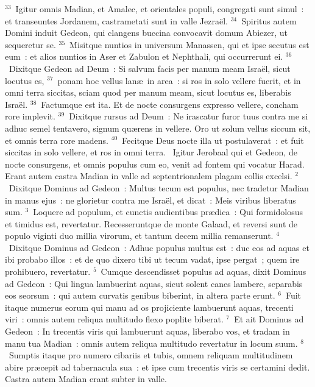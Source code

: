 ${}^{33}$~Igitur omnis Madian, et Amalec, et orientales populi, congregati sunt simul~: et transeuntes Jordanem, castrametati sunt in valle Jezra\"el.
${}^{34}$~Spiritus autem Domini induit Gedeon, qui clangens buccina convocavit domum Abiezer, ut sequeretur se.
${}^{35}$~Misitque nuntios in universum Manassen, qui et ipse secutus est eum~: et alios nuntios in Aser et Zabulon et Nephthali, qui occurrerunt ei.
${}^{36}$~Dixitque Gedeon ad Deum~: Si salvum facis per manum meam Isra\"el, sicut locutus es,
${}^{37}$~ponam hoc vellus lan\ae\ in area~: si ros in solo vellere fuerit, et in omni terra siccitas, sciam quod per manum meam, sicut locutus es, liberabis Isra\"el.
${}^{38}$~Factumque est ita. Et de nocte consurgens expresso vellere, concham rore implevit.
${}^{39}$~Dixitque rursus ad Deum~: Ne irascatur furor tuus contra me si adhuc semel tentavero, signum qu\ae rens in vellere. Oro ut solum vellus siccum sit, et omnis terra rore madens.
${}^{40}$~Fecitque Deus nocte illa ut postulaverat~: et fuit siccitas in solo vellere, et ros in omni terra.
~Igitur Jerobaal qui et Gedeon, de nocte consurgens, et omnis populus cum eo, venit ad fontem qui vocatur Harad. Erant autem castra Madian in valle ad septentrionalem plagam collis excelsi.
${}^{2}$~Dixitque Dominus ad Gedeon~: Multus tecum est populus, nec tradetur Madian in manus ejus~: ne glorietur contra me Isra\"el, et dicat~: Meis viribus liberatus sum.
${}^{3}$~Loquere ad populum, et cunctis audientibus pr\ae dica~: Qui formidolosus et timidus est, revertatur. Recesseruntque de monte Galaad, et reversi sunt de populo viginti duo millia virorum, et tantum decem millia remanserunt.
${}^{4}$~Dixitque Dominus ad Gedeon~: Adhuc populus multus est~: duc eos ad aquas et ibi probabo illos~: et de quo dixero tibi ut tecum vadat, ipse pergat~; quem ire prohibuero, revertatur.
${}^{5}$~Cumque descendisset populus ad aquas, dixit Dominus ad Gedeon~: Qui lingua lambuerint aquas, sicut solent canes lambere, separabis eos seorsum~: qui autem curvatis genibus biberint, in altera parte erunt.
${}^{6}$~Fuit itaque numerus eorum qui manu ad os projiciente lambuerunt aquas, trecenti viri~: omnis autem reliqua multitudo flexo poplite biberat.
${}^{7}$~Et ait Dominus ad Gedeon~: In trecentis viris qui lambuerunt aquas, liberabo vos, et tradam in manu tua Madian~: omnis autem reliqua multitudo revertatur in locum suum.
${}^{8}$~Sumptis itaque pro numero cibariis et tubis, omnem reliquam multitudinem abire pr\ae cepit ad tabernacula sua~: et ipse cum trecentis viris se certamini dedit. Castra autem Madian erant subter in valle.



